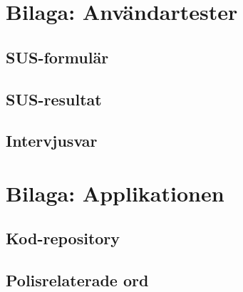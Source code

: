 \documentclass[swedish]{maucsthesis}
\begin{document}
%
\newpage
{}




\appendix

\section{Bilaga: Användartester}

\subsection{SUS-formulär}

\subsection{SUS-resultat}

\subsection{Intervjusvar}

\section{Bilaga: Applikationen}

\subsection{Kod-repository}

\subsection{Polisrelaterade ord}
\end{document}
